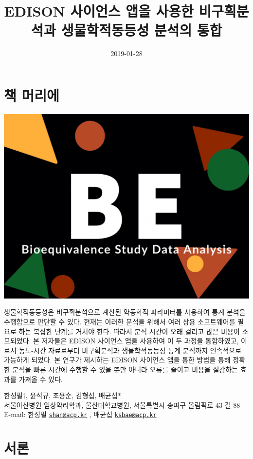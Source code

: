 \documentclass[12pt,]{krantz}
\title{EDISON 사이언스 앱을 사용한 비구획분석과 생물학적동등성 분석의 통합}
\author{}
\date{2019-01-28}
\begin{document}
\maketitle

{
\hypersetup{linkcolor=black}
\setcounter{tocdepth}{2}
\tableofcontents
}
\hypertarget{section}{%
\chapter*{책 머리에}\label{section}}


\includegraphics{logo-BE.jpg}

생물학적동등성은 비구획분석으로 계산된 약동학적 파라미터를 사용하여 통계 분석을 수행함으로 판단할 수 있다. 현재는 이러한 분석을 위해서 여러 상용 소프트웨어를 필요로 하는 복잡한 단계를 거쳐야 한다. 따라서 분석 시간이 오래 걸리고 많은 비용이 소모되었다. 본 저자들은 EDISON 사이언스 앱을 사용하여 이 두 과정을 통합하였고, 이로서 농도-시간 자료로부터 비구획분석과 생물학적동등성 통계 분석까지 연속적으로 가능하게 되었다. 본 연구가 제시하는 EDISON 사이언스 앱을 통한 방법을 통해 정확한 분석을 빠른 시간에 수행할 수 있을 뿐만 아니라 오류를 줄이고 비용을 절감하는 효과를 가져올 수 있다.

한성필†, 윤석규, 조용순, 김형섭, 배균섭*\\
서울아산병원 임상약리학과, 울산대학교병원, 서울특별시 송파구 올림픽로 43 길 88\\
E-mail: 한성필 \href{mailto:shan@acp.kr}{\nolinkurl{shan@acp.kr}} , 배균섭 \href{mailto:ksbae@acp.kr}{\nolinkurl{ksbae@acp.kr}}

\hypertarget{intro}{%
\chapter{서론}\label{intro}}
\end{document}
